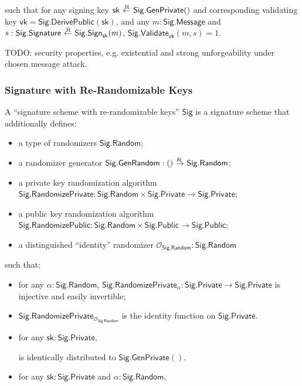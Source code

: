 \documentclass{article}
\newcommand{\typecolon}{:}
\newcommand{\clasp}[3][0pt]{\stackengine{0pt}{#3}{\kern#1#2}{O}{c}{F}{F}{L}}
\newcommand{\rightarrowR}{\mathop{\clasp[-0.18em]{\raisebox{1.15ex}{\scriptsize R}}{$\,\rightarrow\,$}}}
\newcommand{\leftarrowR}{\mathop{\clasp[0.15em]{\raisebox{1.15ex}{\scriptsize R}}{$\,\leftarrow\,$}}}
\newcommand{\Sig}{\mathsf{Sig}}
\newcommand{\SigPublic}{\Sig\mathsf{.Public}}
\newcommand{\SigPrivate}{\Sig\mathsf{.Private}}
\newcommand{\SigMessage}{\Sig\mathsf{.Message}}
\newcommand{\SigSignature}{\Sig\mathsf{.Signature}}
\newcommand{\SigGenPrivate}{\Sig\mathsf{.GenPrivate}}
\newcommand{\SigDerivePublic}{\Sig\mathsf{.DerivePublic}}
\newcommand{\SigSign}[1]{\Sig\mathsf{.Sign}_{#1}}
\newcommand{\SigValidate}[1]{\Sig\mathsf{.Validate}_{#1}}
\newcommand{\SigRandom}{\Sig\mathsf{.Random}}
\newcommand{\SigGenRandom}{\Sig\mathsf{.GenRandom}}
\newcommand{\SigRandomizePublic}{\Sig\mathsf{.RandomizePublic}}
\newcommand{\SigRandomizePrivate}{\Sig\mathsf{.RandomizePrivate}}
\newcommand{\SigRandomizerId}{\Zero_{\SigRandom}}
\newcommand{\SigRandomizer}{\alpha}
\newcommand{\sk}{\mathsf{sk}}
\newcommand{\vk}{\mathsf{vk}}
\newcommand{\Zero}{\mathcal{O}}
\begin{document}
such that for any signing key $\sk \leftarrowR \SigGenPrivate()$ and corresponding
validating key $\vk = \SigDerivePublic(\sk)$, and
any $m \typecolon \SigMessage$ and $s \typecolon \SigSignature \leftarrowR \SigSign{\sk}(m)$,
$\SigValidate{\vk}(m, s) = 1$.

TODO: security properties, e.g. existential and strong unforgeability under chosen message attack.


\subsubsection{Signature with Re-Randomizable Keys} \label{sigrerand}

A ``signature scheme with re-randomizable keys'' $\Sig$ is a signature scheme that
additionally defines:

\begin{itemize}
  \item a type of randomizers $\SigRandom$;
  \item a randomizer generator $\SigGenRandom \typecolon () \rightarrowR \SigRandom$;
  \item a private key randomization algorithm $\SigRandomizePrivate \typecolon \SigRandom \times \SigPrivate \rightarrow \SigPrivate$;
  \item a public key randomization algorithm $\SigRandomizePublic \typecolon \SigRandom \times \SigPublic \rightarrow \SigPublic$;
  \item a distinguished ``identity'' randomizer $\SigRandomizerId \typecolon \SigRandom$
\end{itemize}

such that:

\begin{itemize}
  \item for any $\SigRandomizer \typecolon \SigRandom$,
        $\SigRandomizePrivate_{\SigRandomizer} \typecolon \SigPrivate \rightarrow \SigPrivate$
        is injective and easily invertible;
  \item $\SigRandomizePrivate_{\SigRandomizerId}$ is the identity function on $\SigPrivate$.
  \item for any $\sk \typecolon \SigPrivate$,
        \begin{formulae}
          \item $\SigRandomizePrivate(\SigRandomizer, \sk) : \SigRandomizer \leftarrowR \SigGenRandom()$
        \end{formulae}
        is identically distributed to $\SigGenPrivate()$.
  \item for any $\sk \typecolon \SigPrivate$ and $\SigRandomizer \typecolon \SigRandom$,
\end{itemize}
\end{document}
